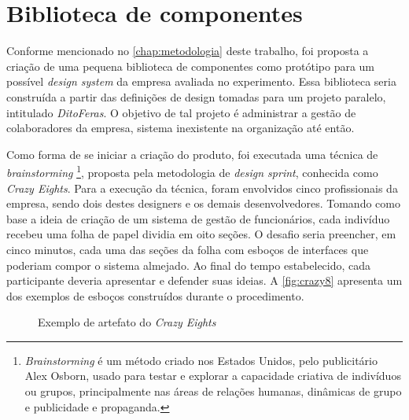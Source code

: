 
\chapter{Biblioteca de componentes}
\label{chap:bibComponentes}

Conforme mencionado no \autoref{chap:metodologia} deste trabalho, foi proposta a criação de uma pequena biblioteca de componentes como protótipo para um possível \textit{design system} da empresa avaliada no experimento. Essa biblioteca seria construída a partir das definições de design tomadas para um projeto paralelo, intitulado \textit{DitoFeras}. O objetivo de tal projeto é administrar a gestão de colaboradores da empresa, sistema inexistente na organização até então.

Como forma de se iniciar a criação do produto, foi executada uma técnica de \textit{brainstorming} \footnote{\textit{Brainstorming} é um método criado nos Estados Unidos, pelo publicitário Alex Osborn, usado para testar e explorar a capacidade criativa de indivíduos ou grupos, principalmente nas áreas de relações humanas, dinâmicas de grupo e publicidade e propaganda.}, proposta pela metodologia de \textit{design sprint}, conhecida como \textit{Crazy Eights}. Para a execução da técnica, foram envolvidos cinco profissionais da empresa, sendo dois destes designers e os demais desenvolvedores. Tomando como base a ideia de criação de um sistema de gestão de funcionários, cada indivíduo recebeu uma folha de papel dividia em oito seções. O desafio seria preencher, em cinco minutos, cada uma das seções da folha com esboços de interfaces que poderiam compor o sistema almejado. Ao final do tempo estabelecido, cada participante deveria apresentar e defender suas ideias. A \autoref{fig:crazy8} apresenta um dos exemplos de esboços construídos durante o procedimento.

\begin{figure}
  \caption{Exemplo de artefato do \textit{Crazy Eights}}
  \label{fig:crazy8}
\end{figure}

